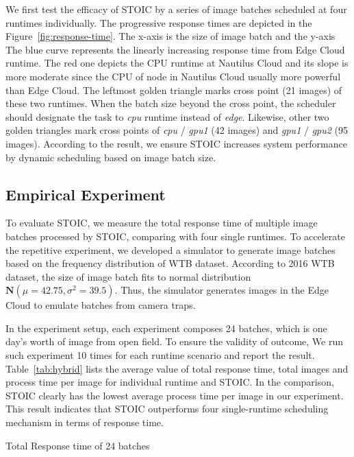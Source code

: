We first test the efficacy of STOIC by a series of image batches scheduled at four runtimes individually. The progressive response times are depicted in the Figure~\ref{fig:response-time}. The x-axis is the size of image batch and the y-axis The blue curve represents the linearly increasing response time from Edge Cloud runtime. The red one depicts the CPU runtime at Nautilus Cloud and its slope is more moderate since the CPU of node in Nautilus Cloud usually more powerful than Edge Cloud. The leftmost golden triangle marks cross point (21 images) of these two runtimes. When the batch size beyond the cross point, the scheduler should designate the task to \textit{cpu} runtime instead of \textit{edge}. Likewise, other two golden triangles mark cross points of \textit{cpu} / \textit{gpu1} (42 images) and \textit{gpu1} / \textit{gpu2} (95 images). According to the result, we ensure STOIC increases system performance by dynamic scheduling based on image batch size.

\subsection{Empirical Experiment}

To evaluate STOIC, we measure the total response time of multiple image batches processed by STOIC, comparing with four single runtimes. To accelerate the repetitive experiment, we developed a simulator to generate image batches based on the frequency distribution of WTB dataset. According to 2016 WTB dataset, the size of image batch fits to normal distribution $\mathbf{N}(\mu = 42.75, \sigma^2 = 39.5)$. Thus, the simulator generates images in the Edge Cloud to emulate batches from camera traps.

In the experiment setup, each experiment composes 24 batches, which is one day's worth of image from open field. To ensure the validity of outcome, We run such experiment 10 times for each runtime scenario and report the result. Table~\ref{tab:hybrid} lists the average value of total response time, total images and process time per image for individual runtime and STOIC. In the comparison, STOIC clearly has the lowest average process time per image in our experiment. This result indicates that STOIC outperforms four single-runtime scheduling mechanism in terms of response time.  

\begin{table}[t] \centering 

\caption{Total Response time of 24 batches
\label{tab:hybrid}}
\end{table}



